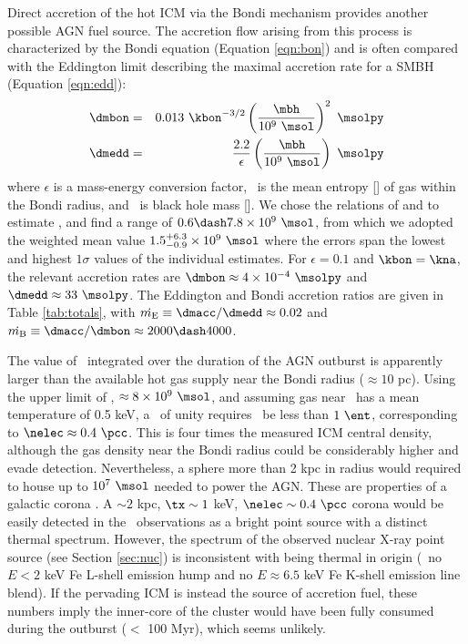 \documentclass[11pt, preprint]{aastex}
\begin{document}
Direct accretion of the hot ICM via the Bondi mechanism provides
another possible AGN fuel source. The accretion flow arising from this
process is characterized by the Bondi equation (Equation
\ref{eqn:bon}) and is often compared with the Eddington limit
describing the maximal accretion rate for a SMBH (Equation
\ref{eqn:edd}):
\begin{eqnarray}
  \dmbon &=& 0.013 ~\kbon^{-3/2} \left(\frac{\mbh}{10^9
    ~\msol}\right)^{2} ~\msolpy \label{eqn:bon}\\
  \dmedd &=& \frac{2.2}{\epsilon} \left(\frac{\mbh}{10^9~\msol}\right)
  ~\msolpy  \label{eqn:edd}
\end{eqnarray}
where $\epsilon$ is a mass-energy conversion factor, \kbon\ is the
mean entropy [\ent] of gas within the Bondi radius, and \mbh\ is black
hole mass [\msol]. We chose the relations of
\citet{2002ApJ...574..740T} and \citet{2007MNRAS.379..711G} to
estimate \mbh, and find a range of $0.6 \dash 7.8 \times 10^9 ~\msol$,
from which we adopted the weighted mean value $1.5^{+6.3}_{-0.9}
\times 10^9 ~\msol$ where the errors span the lowest and highest
$1\sigma$ values of the individual estimates. For $\epsilon = 0.1$ and
$\kbon = \kna$, the relevant accretion rates are $\dmbon \approx 4
\times 10^{-4} ~\msolpy$ and $\dmedd \approx 33 ~\msolpy$. The
Eddington and Bondi accretion ratios are given in Table
\ref{tab:totals}, with $\dme \equiv \dmacc/\dmedd \approx 0.02$ and
$\dmb \equiv \dmacc/\dmbon \approx 2000 \dash 4000$.

The value of \dmb\ integrated over the duration of the AGN outburst is
apparently larger than the available hot gas supply near the Bondi
radius ($\approx 10$ pc). Using the upper limit of \mbh, $\approx 8
\times 10^9 ~\msol$, and assuming gas near \rbon\ has a mean
temperature of 0.5 keV, a \dmb\ of unity requires \kbon\ be less than
$1 ~\ent$, corresponding to $\nelec \approx 0.4 ~\pcc$. This is four
times the measured ICM central density, although the gas density near
the Bondi radius could be considerably higher and evade detection.
Nevertheless, a sphere more than 2 kpc in radius would required to
house up to $10^7 ~\msol$ needed to power the AGN. These are
properties of a galactic corona \citep{coronae}. A $\sim 2$ kpc, $\tx
\sim 1$ keV, $\nelec \sim 0.4 ~\pcc$ corona would be easily detected
in the \cxo\ observations as a bright point source with a distinct
thermal spectrum. However, the spectrum of the observed nuclear X-ray
point source (see Section \ref{sec:nuc}) is inconsistent with being
thermal in origin (\ie\ no $E < 2$ keV Fe L-shell emission hump and no
$E \approx 6.5$ keV Fe K-shell emission line blend). If the pervading
ICM is instead the source of accretion fuel, these numbers imply the
inner-core of the cluster would have been fully consumed during the
outburst ($<$ 100 Myr), which seems unlikely.
\end{document}
